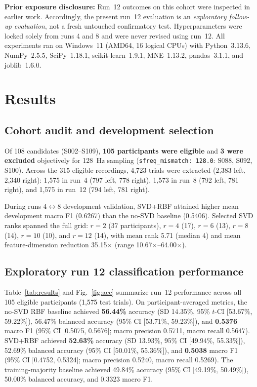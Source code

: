 \documentclass[conference]{IEEEtran}
\begin{document}
\textbf{Prior exposure disclosure:} Run~12 outcomes on this cohort were
inspected in earlier work. Accordingly, the present run~12 evaluation is an
\emph{exploratory follow-up evaluation}, not a fresh untouched confirmatory
test. Hyperparameters were locked solely from runs 4 and 8 and were never
revised using run~12. All experiments ran on Windows~11 (AMD64, 16 logical
CPUs) with Python~3.13.6, NumPy~2.5.5, SciPy~1.18.1, scikit-learn~1.9.1,
MNE~1.13.2, pandas~3.1.1, and joblib~1.6.0.

\section{Results}
\subsection{Cohort audit and development selection}
Of 108 candidates (S002--S109), \textbf{105 participants were eligible} and
\textbf{3 were excluded} objectively for 128~Hz sampling (\texttt{sfreq\_mismatch: 128.0}:
S088, S092, S100). Across the 315 eligible recordings, 4,723 trials were
extracted (2,383 left, 2,340 right): 1,575 in run~4 (797 left, 778 right),
1,573 in run~8 (792 left, 781 right), and 1,575 in run~12 (794 left, 781 right).

During runs 4$\leftrightarrow$8 development validation, SVD+RBF attained higher
mean development macro F1 (0.6267) than the no-SVD baseline (0.5406). Selected
SVD ranks spanned the full grid: $r=2$ (37 participants), $r=4$ (17), $r=6$
(13), $r=8$ (14), $r=10$ (10), and $r=12$ (14), with mean rank 5.71 (median 4)
and mean feature-dimension reduction 35.15$\times$ (range 10.67$\times$--64.00$\times$).

\subsection{Exploratory run 12 classification performance}
Table~\ref{tab:results} and Fig.~\ref{fig:acc} summarize run~12 performance
across all 105 eligible participants (1,575 test trials). On participant-averaged
metrics, the no-SVD RBF baseline achieved \textbf{56.44\%} accuracy (SD 14.35\%,
95\% $t$-CI [53.67\%, 59.22\%]), 56.47\% balanced accuracy (95\% CI [53.71\%,
59.23\%]), and \textbf{0.5376} macro F1 (95\% CI [0.5075, 0.5676]; macro
precision 0.5711, macro recall 0.5647). SVD+RBF achieved \textbf{52.63\%}
accuracy (SD 13.93\%, 95\% CI [49.94\%, 55.33\%]), 52.69\% balanced accuracy
(95\% CI [50.01\%, 55.36\%]), and \textbf{0.5038} macro F1 (95\% CI [0.4752,
0.5324]; macro precision 0.5240, macro recall 0.5269). The training-majority
baseline achieved 49.84\% accuracy (95\% CI [49.19\%, 50.49\%]), 50.00\%
balanced accuracy, and 0.3323 macro F1.
\end{document}
